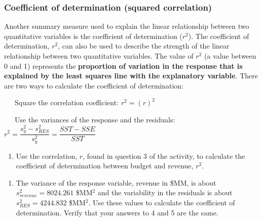 \documentclass[
]{report}
\providecommand{\tightlist}{%
  \setlength{\itemsep}{0pt}\setlength{\parskip}{0pt}}
\begin{document}
\vspace{0.3in}

\hypertarget{coefficient-of-determination-squared-correlation}{%
\subsubsection*{Coefficient of determination (squared correlation)}\label{coefficient-of-determination-squared-correlation}}

Another summary measure used to explain the linear relationship between two quantitative variables is the coefficient of determination (\(r^2\)). The coefficient of determination, \(r^2\), can also be used to describe the strength of the linear relationship between two quantitative variables. The value of \(r^2\) (a value between 0 and 1) represents the \textbf{proportion of variation in the response that is explained by the least squares line with the explanatory variable}. There are two ways to calculate the coefficient of determination:

~~~Square the correlation coefficient: \(r^2 = (r)^2\)

~~~Use the variances of the response and the residuals: \(r^2 = \dfrac{s_y^2 - s_{RES}^2}{s_y^2} = \dfrac{SST - SSE}{SST}\)

\begin{enumerate}
\def\labelenumi{\arabic{enumi}.}
\setcounter{enumi}{3}
\tightlist
\item
  Use the correlation, \(r\), found in question 3 of the activity, to calculate the coefficient of determination between budget and revenue, \(r^2\).
\end{enumerate}

\vspace{.4in}

\newpage

\begin{enumerate}
\def\labelenumi{\arabic{enumi}.}
\setcounter{enumi}{4}
\tightlist
\item
  The variance of the response variable, revenue in \$MM, is about \(s_{revenue}^2 = 8024.261\) \$MM\(^2\) and the variability in the residuals is about \(s_{RES}^2 = 4244.832\) \$MM\(^2\). Use these values to calculate the coefficient of determination. Verify that your answers to 4 and 5 are the same.
\end{enumerate}

\vspace{1in}
\end{document}
